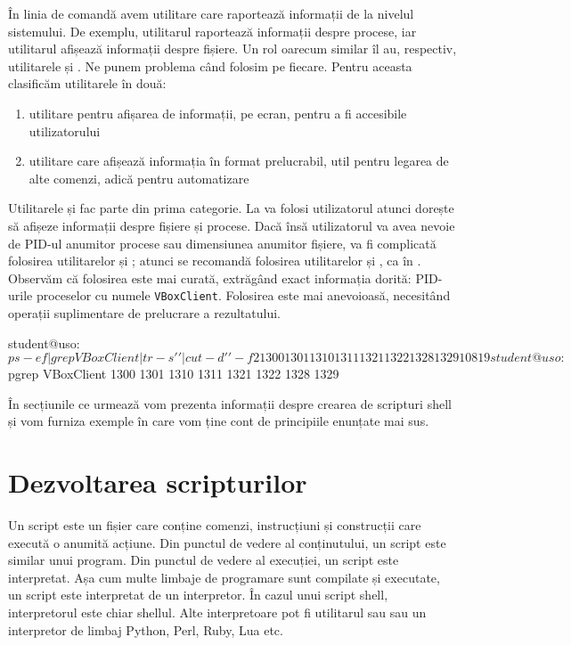 În linia de comandă avem utilitare care raportează informații de la nivelul sistemului.
De exemplu, utilitarul  raportează informații despre procese, iar utilitarul  afișează informații despre fișiere.
Un rol oarecum similar îl au, respectiv, utilitarele  și .
Ne punem problema când folosim pe fiecare.
Pentru aceasta clasificăm utilitarele în două:
\begin{enumerate}
  \item utilitare pentru afișarea de informații, pe ecran, pentru a fi accesibile utilizatorului
  \item utilitare care afișează informația în format prelucrabil, util pentru legarea de alte comenzi, adică pentru automatizare
\end{enumerate}

Utilitarele  și  fac parte din prima categorie.
La va folosi utilizatorul atunci dorește să afișeze informații despre fișiere și procese.
Dacă însă utilizatorul va avea nevoie de PID-ul anumitor procese sau dimensiunea anumitor fișiere, va fi complicată folosirea utilitarelor  și ; atunci se recomandă folosirea utilitarelor  și , ca în .
Observăm că folosirea  este mai curată, extrăgând exact informația dorită: PID-urile proceselor cu numele \texttt{VBoxClient}.
Folosirea  este mai anevoioasă, necesitând operații suplimentare de prelucrare a rezultatului.

\begin{screen}[caption={Utiltare pentru afișare și pentru prelucrare},label={lst:auto:print-vs-process-cmd}]
student@uso:~$ ps -ef | grep VBoxClient | tr -s ' ' | cut -d ' ' -f 2
1300
1301
1310
1311
1321
1322
1328
1329
10819
student@uso:~$ pgrep VBoxClient
1300
1301
1310
1311
1321
1322
1328
1329
\end{screen}

În secțiunile ce urmează vom prezenta informații despre crearea de scripturi shell și vom furniza exemple în care vom ține cont de principiile enunțate mai sus.

\section{Dezvoltarea scripturilor}
\label{sec:auto:dev}

Un script este un fișier care conține comenzi, instrucțiuni și construcții care execută o anumită acțiune.
Din punctul de vedere al conținutului, un script este similar unui program.
Din punctul de vedere al execuției, un script este interpretat.
Așa cum multe limbaje de programare sunt compilate și executate, un script este interpretat de un interpretor.
În cazul unui script shell, interpretorul este chiar shellul.
Alte interpretoare pot fi utilitarul  sau  sau un interpretor de limbaj Python, Perl, Ruby, Lua etc.

